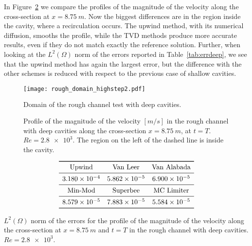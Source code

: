 In Figure~\ref{fig:linecompdeep} we compare the profiles of the magnitude of 
the velocity along the cross-section at $x=\SI{8.75}{m}$. Now the biggest 
differences 
are in the region inside the cavity, where a recirculation occurs. The upwind 
method, with its numerical diffusion, smooths the profile, while the TVD 
methods produce more accurate results, even if they do not match exactly the 
reference solution. Further, when looking at the $L^2(\Omega)$ norm of the errors 
reported in 
Table~\ref{tab:errdeep}, we see that the upwind method has again the largest error, 
but the difference with the other schemes is reduced with respect to the 
previous case of shallow cavities.
\begin{figure}
	\centering
	\texttt{[image: rough\_domain\_highstep2.pdf]}
	\caption[Domain of the rough channel test with deep cavities]{Domain of the 
	rough channel test with deep cavities.}
	\label{fig:roughdomdeep}
\end{figure}
\begin{figure}
	\centering
	
	\caption[Profile of the magnitude of the velocity in the rough channel with 
	deep cavities at $Re=\num{2.8e3}$]{Profile of the magnitude of the velocity 
		$[\si{m/s}]$ in the rough channel with deep cavities along the 
		cross-section 
		$x=\SI{8.75}{m}$, at $t=T$. $Re=\num{2.8e3}$. The region on 
		the 
		left of the dashed line is inside the cavity.}
	\label{fig:linecompdeep}
\end{figure}
\begin{table}
	\centering
	\[
	\begin{array}{ccc}
	\toprule
	\text{Upwind} & \text{Van Leer} & \text{Van Alabada}\\
	\midrule
	\num{3.180e-4} & \num{5.862e-5} & \num{6.900e-5}\\
	\midrule
	\text{Min-Mod} & \text{Superbee} & \text{MC Limiter} \\
	\midrule
	\num{8.579e-5} & \num{7.883e-5} & \num{5.584e-5}\\
	\bottomrule
	\end{array}
	\]
	\caption[$L^2(\Omega)$ norm of the errors for the profile of the magnitude 
	of the 
	velocity in 
	the rough channel with deep cavities]{$L^2(\Omega)$ norm of the errors for 
	the profile 
	of the 
	magnitude of the velocity along the cross-section at $x=\SI{8.75}{m}$ and 
	$t=T$ in the rough channel with deep cavities. $Re = \num{2.8e3}$.}
	\label{tab:errdeep}
\end{table}
%
